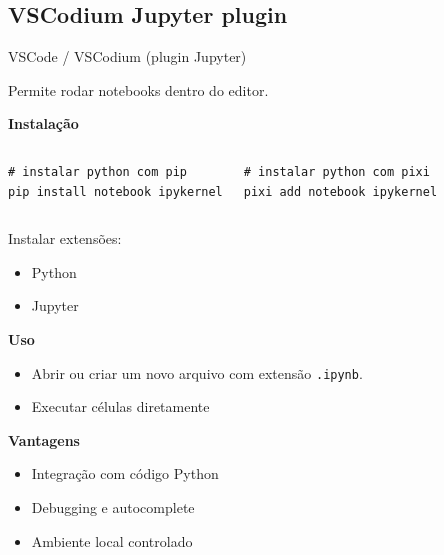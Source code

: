 \documentclass{beamer}
\begin{document}
\subsection{VSCodium Jupyter plugin}
\begin{frame}[fragile]{VSCode / VSCodium (plugin Jupyter)}
    
    Permite rodar notebooks dentro do editor.
    
    \vspace{0.3cm}
    
    \textbf{Instalação}
    \begin{columns}[t]
            \begin{verbatim}
# instalar python com pip
pip install notebook ipykernel
        \end{verbatim}
            \begin{verbatim}
# instalar python com pixi
pixi add notebook ipykernel
        \end{verbatim}
    \end{columns}

    
    Instalar extensões:
    
    \begin{itemize}
        \item Python
        \item Jupyter
    \end{itemize}
    
    \vspace{0.3cm}
    
    \textbf{Uso}
    
    \begin{itemize}
        \item Abrir ou criar um novo arquivo com extensão \texttt{.ipynb}.
        \item Executar células diretamente
    \end{itemize}
    
    \vspace{0.3cm}
    
    \textbf{Vantagens}
    
    \begin{itemize}
        \item Integração com código Python
        \item Debugging e autocomplete
        \item Ambiente local controlado
    \end{itemize}
    
\end{frame}
\end{document}
